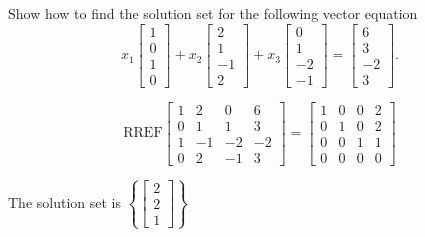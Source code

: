 
\begin{exerciseStatement}


Show how to find the solution set for the following vector equation \[ x_{1} \left[\begin{array}{c}
1 \\
0 \\
1 \\
0
\end{array}\right] + x_{2} \left[\begin{array}{c}
2 \\
1 \\
-1 \\
2
\end{array}\right] + x_{3} \left[\begin{array}{c}
0 \\
1 \\
-2 \\
-1
\end{array}\right] = \left[\begin{array}{c}
6 \\
3 \\
-2 \\
3
\end{array}\right] .\]


\end{exerciseStatement}
    
\begin{exerciseAnswer} 
\[\mathrm{RREF} \left[\begin{array}{ccc|c}
1 & 2 & 0 & 6 \\
0 & 1 & 1 & 3 \\
1 & -1 & -2 & -2 \\
0 & 2 & -1 & 3
\end{array}\right]  =  \left[\begin{array}{ccc|c}
1 & 0 & 0 & 2 \\
0 & 1 & 0 & 2 \\
0 & 0 & 1 & 1 \\
0 & 0 & 0 & 0
\end{array}\right] \]

The solution set is \( \left\{ \left[\begin{array}{c}
2 \\
2 \\
1
\end{array}\right] \right\} \)


\end{exerciseAnswer}
    
